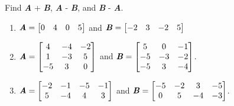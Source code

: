 \begin{Exercise}[title = {Adding and Subtracting Matrices}, label = add_mat]
Find \textbf{\textit{A}} + \textbf{\textit{B}}, \textbf{\textit{A}} -
\textbf{\textit{B}}, and \textbf{\textit{B}} - \textbf{\textit{A}}.
\begin{enumerate}
\item $\textbf{\textit{A}} = \begin{bmatrix}
0 & 4 & 0 & 5
\end{bmatrix}$ and $\textbf{\textit{B}} = \begin{bmatrix}
-2 & 3 & -2 & 5
\end{bmatrix}$
\item $\textbf{\textit{A}} = \begin{bmatrix}
4 & -4 & -2\\
1 & -3 & 5\\
-5 & 3 & 0
\end{bmatrix}$ and $\textbf{\textit{B}} = \begin{bmatrix}
5 & 0 & -1\\
-5 & -3 & -2\\
-5 & 3 & -4
\end{bmatrix}$.
\item $\textbf{\textit{A}} = \begin{bmatrix}
-2 & -1 & -5 & -1\\
5 & -4 & 4 & 3
\end{bmatrix}$ and $\textbf{\textit{B}} = \begin{bmatrix}
-5 & -2 & 3 & -5\\
0 & 5 & -4 & -3
\end{bmatrix}$.
\end{enumerate}
\end{Exercise}

